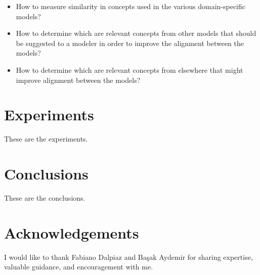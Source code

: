 \documentclass{article}
\begin{document}
\begin{itemize}
	\item How to measure similarity in concepts used in the various domain-specific models?
	\item How to determine which are relevant concepts from other models that should be suggested to a modeler in order to improve the alignment between the models?
	\item How to determine which are relevant concepts from elsewhere that might improve alignment between the models?
\end{itemize}

\section{Experiments}

These are the experiments.

\section{Conclusions}

These are the conclusions.

\section{Acknowledgements}

I would like to thank Fabiano Dalpiaz and Ba\c sak Aydemir for sharing expertise, valuable guidance, and encouragement with me.

\printbibliography
\end{document}
